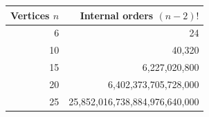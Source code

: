 \begin{tabular}{rr}
\toprule Vertices $n$ & Internal orders $(n-2)!$ \\
\midrule
6 & 24 \\
10 & 40,320 \\
15 & 6,227,020,800 \\
20 & 6,402,373,705,728,000 \\
25 & 25,852,016,738,884,976,640,000 \\
\bottomrule
\end{tabular}

